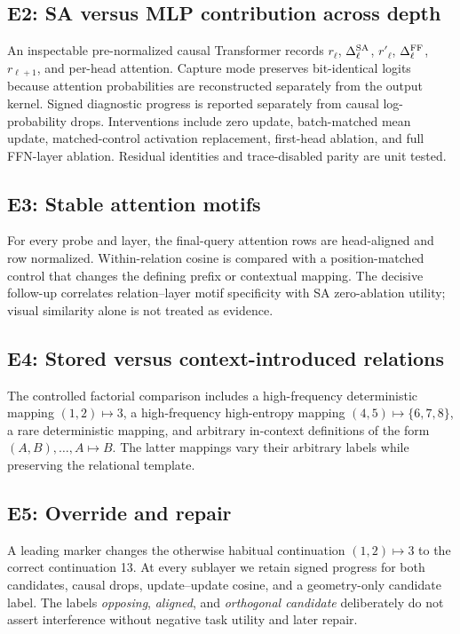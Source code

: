 \documentclass[10pt]{article}
\begin{document}
\subsection{E2: SA versus MLP contribution across depth}
An inspectable pre-normalized causal Transformer records $r_\ell$, $\Delta^{\rm SA}_\ell$, $r'_\ell$, $\Delta^{\rm FF}_\ell$, $r_{\ell+1}$, and per-head attention. Capture mode preserves bit-identical logits because attention probabilities are reconstructed separately from the output kernel. Signed diagnostic progress is reported separately from causal log-probability drops. Interventions include zero update, batch-matched mean update, matched-control activation replacement, first-head ablation, and full FFN-layer ablation. Residual identities and trace-disabled parity are unit tested.

\subsection{E3: Stable attention motifs}
For every probe and layer, the final-query attention rows are head-aligned and row normalized. Within-relation cosine is compared with a position-matched control that changes the defining prefix or contextual mapping. The decisive follow-up correlates relation--layer motif specificity with SA zero-ablation utility; visual similarity alone is not treated as evidence.

\subsection{E4: Stored versus context-introduced relations}
The controlled factorial comparison includes a high-frequency deterministic mapping $(1,2)\mapsto3$, a high-frequency high-entropy mapping $(4,5)\mapsto\{6,7,8\}$, a rare deterministic mapping, and arbitrary in-context definitions of the form $(A,B),\ldots,A\mapsto B$. The latter mappings vary their arbitrary labels while preserving the relational template.

\subsection{E5: Override and repair}
A leading marker changes the otherwise habitual continuation $(1,2)\mapsto3$ to the correct continuation 13. At every sublayer we retain signed progress for both candidates, causal drops, update--update cosine, and a geometry-only candidate label. The labels \emph{opposing}, \emph{aligned}, and \emph{orthogonal candidate} deliberately do not assert interference without negative task utility and later repair.
\end{document}

